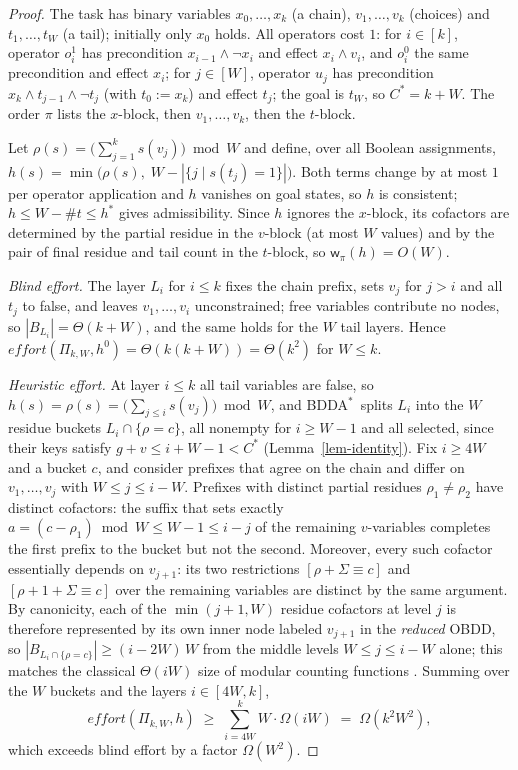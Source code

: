\documentclass[letterpaper]{article}
\newcommand{\task}{\ensuremath{\Pi}}
\newcommand{\hstar}{\ensuremath{h^{*}}}
\newcommand{\hblind}{\ensuremath{h^{0}}}
\newcommand{\copt}{\ensuremath{C^{*}}}
\newcommand{\bddsize}[1]{\ensuremath{|B_{#1}|}}
\newcommand{\width}{\ensuremath{\mathsf{w}}}
\newcommand{\effort}{\ensuremath{\mathit{effort}}}
\newcommand{\bddastar}{BDDA\ensuremath{^{*}}}
\theoremstyle{plain}
\theoremstyle{definition}
\theoremstyle{remark}
\begin{document}
\begin{proof}
The task has binary variables $x_0, \dots, x_k$ (a chain),
$v_1, \dots, v_k$ (choices) and $t_1, \dots, t_W$ (a tail); initially
only $x_0$ holds. All operators cost $1$: for $i \in [k]$, operator
$o_i^1$ has precondition $x_{i-1} \wedge \neg x_i$ and effect
$x_i \wedge v_i$, and $o_i^0$ the same precondition and effect $x_i$;
for $j \in [W]$, operator $u_j$ has precondition
$x_k \wedge t_{j-1} \wedge \neg t_j$ (with $t_0 := x_k$) and effect
$t_j$; the goal is $t_W$, so $\copt = k + W$. The order $\pi$ lists the
$x$-block, then $v_1, \dots, v_k$, then the $t$-block.

Let $\rho(s) = \bigl(\sum_{j=1}^{k} s(v_j)\bigr) \bmod W$ and define,
over all Boolean assignments,
$h(s) = \min\bigl(\rho(s),\; W - |\{ j \mid s(t_j) = 1 \}|\bigr)$.
Both terms change by at most $1$ per operator application and $h$
vanishes on goal states, so $h$ is consistent; $h \leq W - \#t \leq
\hstar$ gives admissibility. Since $h$ ignores the $x$-block, its
cofactors are determined by the partial residue in the $v$-block (at
most $W$ values) and by the pair of final residue and tail count in the
$t$-block, so $\width_\pi(h) = O(W)$.

\emph{Blind effort.} The layer $L_i$ for $i \leq k$ fixes the chain
prefix, sets $v_j$ for $j > i$ and all $t_j$ to false, and leaves
$v_1, \dots, v_i$ unconstrained; free variables contribute no nodes, so
$\bddsize{L_i} = \Theta(k + W)$, and the same holds for the $W$ tail
layers. Hence $\effort(\task_{k,W}, \hblind) = \Theta(k(k+W)) =
\Theta(k^2)$ for $W \leq k$.

\emph{Heuristic effort.} At layer $i \leq k$ all tail variables are
false, so $h(s) = \rho(s) = \bigl(\sum_{j \leq i} s(v_j)\bigr) \bmod W$,
and \bddastar\ splits $L_i$ into the $W$ residue buckets
$L_i \cap \{\rho = c\}$, all nonempty for $i \geq W - 1$ and all
selected, since their keys satisfy $g + v \leq i + W - 1 < \copt$
(Lemma~\ref{lem-identity}). Fix $i \geq 4W$ and a bucket $c$, and
consider prefixes that agree on the chain and differ on
$v_1, \dots, v_j$ with $W \leq j \leq i - W$. Prefixes with distinct
partial residues $\rho_1 \neq \rho_2$ have distinct cofactors: the
suffix that sets exactly $a = (c - \rho_1) \bmod W \leq W - 1 \leq i - j$
of the remaining $v$-variables completes the first prefix to the bucket
but not the second. Moreover, every such cofactor essentially depends on
$v_{j+1}$: its two restrictions $[\rho + \Sigma \equiv c]$ and
$[\rho + 1 + \Sigma \equiv c]$ over the remaining variables are distinct
by the same argument. By canonicity, each of the $\min(j+1, W)$ residue
cofactors at level $j$ is therefore represented by its own inner node
labeled $v_{j+1}$ in the \emph{reduced} OBDD, so
$\bddsize{L_i \cap \{\rho = c\}} \geq (i - 2W) \, W$ from the middle
levels $W \leq j \leq i - W$ alone; this matches the classical
$\Theta(iW)$ size of modular counting functions \citep{wegener-2000}.
Summing over the $W$ buckets and the layers $i \in [4W, k]$,
\[
\effort(\task_{k,W}, h)
\;\geq\; \sum_{i=4W}^{k} W \cdot \Omega(iW)
\;=\; \Omega(k^{2} W^{2}),
\]
which exceeds blind effort by a factor $\Omega(W^{2})$.
\end{proof}
\end{document}
